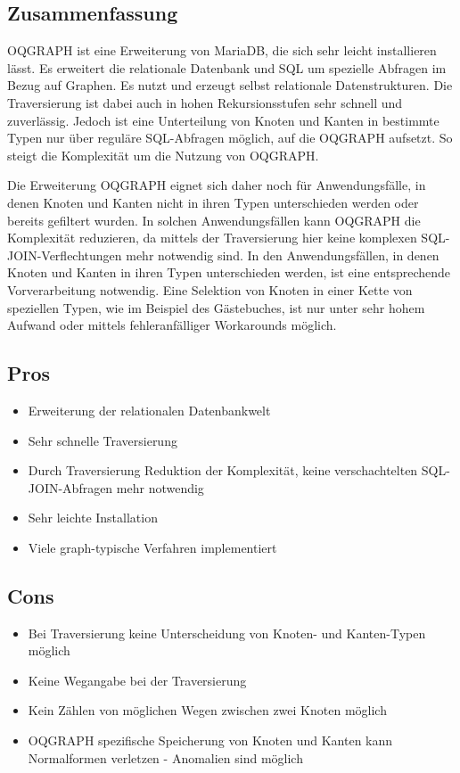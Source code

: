 \subsection{Zusammenfassung}

OQGRAPH ist eine Erweiterung von MariaDB, die sich sehr leicht installieren lässt. Es erweitert die relationale Datenbank und SQL um spezielle Abfragen im Bezug auf Graphen. Es nutzt und erzeugt selbst relationale Datenstrukturen. Die Traversierung ist dabei auch in hohen Rekursionsstufen sehr schnell und zuverlässig. Jedoch ist eine Unterteilung von Knoten und Kanten in bestimmte Typen nur über reguläre SQL-Abfragen möglich, auf die OQGRAPH aufsetzt. So steigt die Komplexität um die Nutzung von OQGRAPH.

Die Erweiterung OQGRAPH eignet sich daher noch für Anwendungsfälle, in denen Knoten und Kanten nicht in ihren Typen unterschieden werden oder bereits gefiltert wurden. In solchen Anwendungsfällen kann OQGRAPH die Komplexität reduzieren, da mittels der Traversierung hier keine komplexen SQL-JOIN-Verflechtungen mehr notwendig sind. In den Anwendungsfällen, in denen Knoten und Kanten in ihren Typen unterschieden werden, ist eine entsprechende Vorverarbeitung notwendig. Eine Selektion von Knoten in einer Kette von speziellen Typen, wie im Beispiel des Gästebuches, ist nur unter sehr hohem Aufwand oder mittels fehleranfälliger Workarounds möglich.

\subsection{Pros}
\begin{itemize}
	\setlength\itemsep{-0.5em}
	\item Erweiterung der relationalen Datenbankwelt
	\item Sehr schnelle Traversierung
	\item Durch Traversierung Reduktion der Komplexität, keine verschachtelten SQL-JOIN-Abfragen mehr notwendig
	\item Sehr leichte Installation
	\item Viele graph-typische Verfahren implementiert
\end{itemize}

\subsection{Cons}
\begin{itemize}
	\setlength\itemsep{-0.5em}
	\item Bei Traversierung keine Unterscheidung von Knoten- und Kanten-Typen möglich
	\item Keine Wegangabe bei der Traversierung
	\item Kein Zählen von möglichen Wegen zwischen zwei Knoten möglich
	\item OQGRAPH spezifische Speicherung von Knoten und Kanten kann Normalformen verletzen - Anomalien sind möglich
\end{itemize}